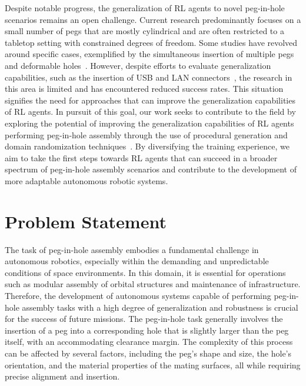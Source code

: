 Despite notable progress, the generalization of RL agents to novel peg-in-hole scenarios remains an open challenge. Current research predominantly focuses on a small number of pegs that are mostly cylindrical and are often restricted to a tabletop setting with constrained degrees of freedom. Some studies have revolved around specific cases, exemplified by the simultaneous insertion of multiple pegs~\cite{li2022multiple} and deformable holes~\cite {luo2018deep}. However, despite efforts to evaluate generalization capabilities, such as the insertion of USB and LAN connectors~\cite{beltran2020variable}, the research in this area is limited and has encountered reduced success rates. This situation signifies the need for approaches that can improve the generalization capabilities of RL agents. In pursuit of this goal, our work seeks to contribute to the field by exploring the potential of improving the generalization capabilities of RL agents performing peg-in-hole assembly through the use of procedural generation and domain randomization techniques~\cite{tobin2017domain}. By diversifying the training experience, we aim to take the first steps towards RL agents that can succeed in a broader spectrum of peg-in-hole assembly scenarios and contribute to the development of more adaptable autonomous robotic systems.


\section{Problem Statement}\label{sec:problem-statement}

The task of peg-in-hole assembly embodies a fundamental challenge in autonomous robotics, especially within the demanding and unpredictable conditions of space environments. In this domain, it is essential for operations such as modular assembly of orbital structures and maintenance of infrastructure. Therefore, the development of autonomous systems capable of performing peg-in-hole assembly tasks with a high degree of generalization and robustness is crucial for the success of future missions. The peg-in-hole task generally involves the insertion of a peg into a corresponding hole that is slightly larger than the peg itself, with an accommodating clearance margin. The complexity of this process can be affected by several factors, including the peg's shape and size, the hole's orientation, and the material properties of the mating surfaces, all while requiring precise alignment and insertion.

